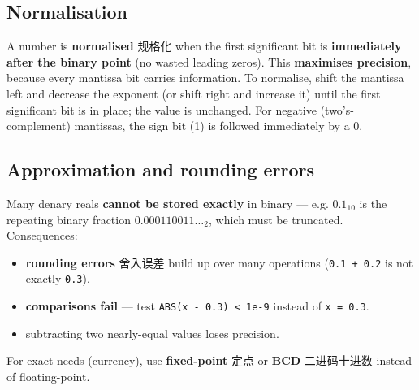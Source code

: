 \documentclass[11pt]{article}
\begin{document}
\subsection*{Normalisation}

A number is \textbf{normalised} 规格化 when the first significant bit is \textbf{immediately after the binary point} (no wasted leading zeros). This \textbf{maximises precision}, because every mantissa bit carries information. To normalise, shift the mantissa left and decrease the exponent (or shift right and increase it) until the first significant bit is in place; the value is unchanged. For negative (two's-complement) mantissas, the sign bit (1) is followed immediately by a 0.

\subsection*{Approximation and rounding errors}

Many denary reals \textbf{cannot be stored exactly} in binary — e.g. $0.1_{10}$ is the repeating binary fraction $0.000110011\ldots_{2}$, which must be truncated. Consequences:

\begin{itemize}
\item \textbf{rounding errors} 舍入误差 build up over many operations (\texttt{0.1 + 0.2} is not exactly \texttt{0.3}).

\item \textbf{comparisons fail} — test \texttt{ABS(x - 0.3) \textless{} 1e-9} instead of \texttt{x = 0.3}.

\item subtracting two nearly-equal values loses precision.

\end{itemize}

For exact needs (currency), use \textbf{fixed-point} 定点 or \textbf{BCD} 二进码十进数 instead of floating-point.
\end{document}

